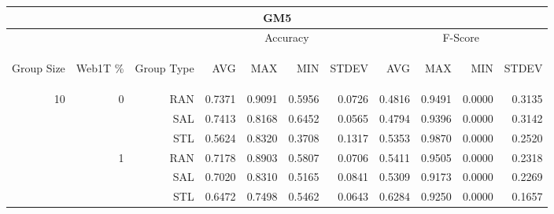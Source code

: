 \begin{center}
\begin{table}[htbp]
\begin{tabular}{ | r | r | r | r | r | r | r | r | r | r | r |}
\hline
\multicolumn{11}{|c|}{GM5}\\
\hline
 & & & \multicolumn{4}{|c|}{Accuracy} & \multicolumn{4}{|c|}{F-Score}\\ \cline{4-11}
\begin{sideways}Group Size\end{sideways} & \begin{sideways}Web1T \%\end{sideways} & \begin{sideways}Group Type\end{sideways} & \begin{sideways}AVG\end{sideways} & \begin{sideways}MAX\end{sideways} & \begin{sideways}MIN\end{sideways} & \begin{sideways}STDEV\end{sideways} & \begin{sideways}AVG\end{sideways} & \begin{sideways}MAX\end{sideways} & \begin{sideways}MIN\end{sideways} & \begin{sideways}STDEV\end{sideways}\\
\hline
\multirow{18}{*}{10}
 & \multirow{3}{*}{0} & RAN & 0.7371 & 0.9091 & 0.5956 & 0.0726 & 0.4816 & 0.9491 & 0.0000 & 0.3135\\ \cline{3-11}
 &   & SAL & 0.7413 & 0.8168 & 0.6452 & 0.0565 & 0.4794 & 0.9396 & 0.0000 & 0.3142\\ \cline{3-11}
 &   & STL & 0.5624 & 0.8320 & 0.3708 & 0.1317 & 0.5353 & 0.9870 & 0.0000 & 0.2520\\ \cline{2-11}
 & \multirow{3}{*}{1} & RAN & 0.7178 & 0.8903 & 0.5807 & 0.0706 & 0.5411 & 0.9505 & 0.0000 & 0.2318\\ \cline{3-11}
 &   & SAL & 0.7020 & 0.8310 & 0.5165 & 0.0841 & 0.5309 & 0.9173 & 0.0000 & 0.2269\\ \cline{3-11}
 &   & STL & 0.6472 & 0.7498 & 0.5462 & 0.0643 & 0.6284 & 0.9250 & 0.0000 & 0.1657\\ \cline{2-11}

\end{tabular}
\end{table}
\end{center}
